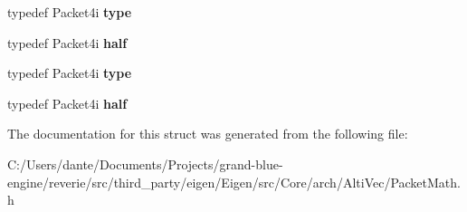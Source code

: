 \begin{DoxyCompactItemize}
\mbox{\label{struct_eigen_1_1internal_1_1packet__traits_3_01int_01_4_a4c035d9ce275515f3eabf2934623190b}} 
typedef Packet4i {\bfseries type}
\item 
\mbox{\label{struct_eigen_1_1internal_1_1packet__traits_3_01int_01_4_abcd1d398b42e5452213afe6652f7cebb}} 
typedef Packet4i {\bfseries half}
\item 
\mbox{\label{struct_eigen_1_1internal_1_1packet__traits_3_01int_01_4_a4c035d9ce275515f3eabf2934623190b}} 
typedef Packet4i {\bfseries type}
\item 
\mbox{\label{struct_eigen_1_1internal_1_1packet__traits_3_01int_01_4_abcd1d398b42e5452213afe6652f7cebb}} 
typedef Packet4i {\bfseries half}
\end{DoxyCompactItemize}


The documentation for this struct was generated from the following file\+:\begin{DoxyCompactItemize}
\item 
C\+:/\+Users/dante/\+Documents/\+Projects/grand-\/blue-\/engine/reverie/src/third\+\_\+party/eigen/\+Eigen/src/\+Core/arch/\+Alti\+Vec/Packet\+Math.\+h\end{DoxyCompactItemize}
